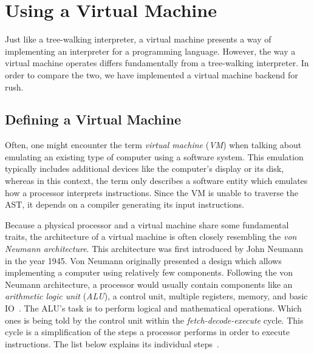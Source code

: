 \section{Using a Virtual Machine}

Just like a tree-walking interpreter, a virtual machine presents a way of implementing an interpreter for a programming language.
However, the way a virtual machine operates differs fundamentally from a tree-walking interpreter.
In order to compare the two, we have implemented a virtual machine backend for rush.

\subsection{Defining a Virtual Machine}

Often, one might encounter the term \emph{virtual machine} (\emph{VM}) when talking about emulating an existing type of computer using a software system.
This emulation typically includes additional devices like the computer's display or its disk,
whereas in this context, the term only describes a software entity which emulates how a processor interprets instructions.
Since the VM is unable to traverse the AST, it depends on a compiler generating its input instructions.

Because a physical processor and a virtual machine share some fundamental traits,
the architecture of a virtual machine is often closely resembling the \emph{von Neumann architecture}.
This architecture was first introduced by John Neumann in the year 1945.
Von Neumann originally presented a design which allows implementing a computer using relatively few components.
Following the von Neumann architecture, a processor would usually contain components like an \emph{arithmetic logic unit} (\emph{ALU}), a control unit, multiple registers, memory, and basic IO~\cite[p.~172]{Ledin2020-yp}.
The ALU's task is to perform logical and mathematical operations.
Which ones is being told by the control unit within the \emph{fetch-decode-execute} cycle.
This cycle is a simplification of the steps a processor performs in order to execute instructions.
The list below explains its individual steps~\cite[pp.~208--209]{Ledin2020-yp}.

